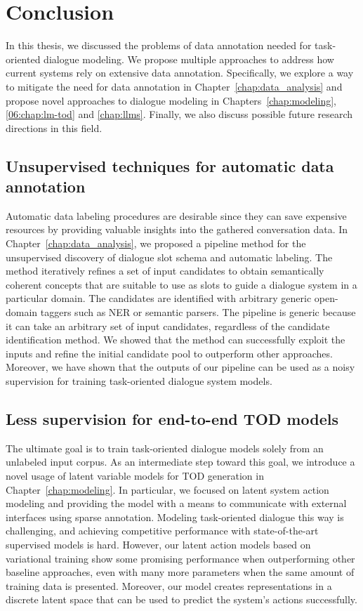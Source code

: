 \chapter{Conclusion}
\label{chap:conclusion}
In this thesis, we discussed the problems of data annotation needed for task-oriented dialogue modeling.
We propose multiple approaches to address how current systems rely on extensive data annotation.
Specifically, we explore a way to mitigate the need for data annotation in Chapter~\ref{chap:data_analysis} and propose novel approaches to dialogue modeling in Chapters~\ref{chap:modeling}, \ref{06:chap:lm-tod} and \ref{chap:llms}.
Finally, we also discuss possible future research directions in this field.

\section{Unsupervised techniques for automatic data annotation}
Automatic data labeling procedures are desirable since they can save expensive resources by providing valuable insights into the gathered conversation data.
In Chapter~\ref{chap:data_analysis}, we proposed a pipeline method for the unsupervised discovery of dialogue slot schema and automatic labeling.
The method iteratively refines a set of input candidates to obtain semantically coherent concepts that are suitable to use as slots to guide a dialogue system in a particular domain.
The candidates are identified with arbitrary generic open-domain taggers such as NER or semantic parsers.
The pipeline is generic because it can take an arbitrary set of input candidates, regardless of the candidate identification method.
We showed that the method can successfully exploit the inputs and refine the initial candidate pool to outperform other approaches.
Moreover, we have shown that the outputs of our pipeline can be used as a noisy supervision for training task-oriented dialogue system models.

\section{Less supervision for end-to-end TOD models}
The ultimate goal is to train task-oriented dialogue models solely from an unlabeled input corpus.
As an intermediate step toward this goal, we introduce a novel usage of latent variable models for TOD generation in Chapter~\ref{chap:modeling}.
In particular, we focused on latent system action modeling and providing the model with a means to communicate with external interfaces using sparse annotation.
Modeling task-oriented dialogue this way is challenging, and achieving competitive performance with state-of-the-art supervised models is hard.
However, our latent action models based on variational training show some promising performance when outperforming other baseline approaches, even with many more parameters when the same amount of training data is presented.
Moreover, our model creates representations in a discrete latent space that can be used to predict the system's actions successfully.

